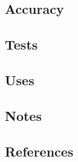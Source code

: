 \documentclass{article}
\begin{document}

\subsection{Accuracy}


\subsection{Tests}


\subsection{Uses}



\subsection{Notes}


\subsection{References}

\end{document}
